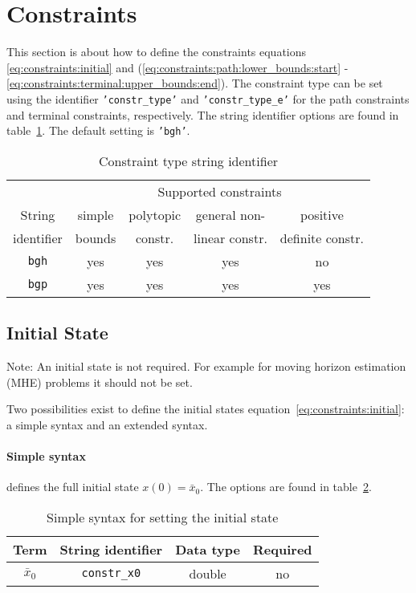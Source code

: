 \documentclass[english]{article}
\newcommand{\code}[1]{\texttt{#1}}
\newcommand{\str}[1]{\texttt{'#1'}}
\newcommand{\optional}{no}
\begin{document}
\section{Constraints}\label{sec:constraints}
%
This section is about how to define the constraints equations \eqref{eq:constraints:initial} and (\ref{eq:constraints:path:lower_bounds:start} - \ref{eq:constraints:terminal:upper_bounds:end}). The constraint type can be set using the identifier \str{constr\_type} and \str{constr\_type\_e} for the path constraints and terminal constraints, respectively. The string identifier options are found in table~\ref{tab:constr_type}. The default setting is \str{bgh}.
\begin{table}[h!]
\centering
\caption{Constraint type string identifier}\label{tab:constr_type}
%
\begin{tabular}{ccccc}
    \toprule
    & \multicolumn{4}{c}{Supported constraints} \\ \cmidrule{2-5}
    String     & simple & polytopic & general non-   & positive \\
    identifier & bounds & constr.   & linear constr. & definite constr.\\ \midrule
    \code{bgh} & yes & yes & yes & no \\
    \code{bgp} & yes & yes & yes & yes \\
    \bottomrule
\end{tabular}
\end{table}
%
\subsection{Initial State}\label{sec:constraints:initial}
%
Note: An initial state is not required.
For example for moving horizon estimation (MHE) problems it should not be set.

Two possibilities exist to define the initial states equation~\eqref{eq:constraints:initial}: a simple syntax and an extended syntax.

\paragraph{Simple syntax}
defines the full initial state $x(0)=\bar{x}_0$. The options are found in table~\ref{tab:constraints:simplesyntax}.
\begin{table}[h!]
    \centering
    \caption{Simple syntax for setting the initial state} \label{tab:constraints:simplesyntax}
    \begin{tabular}{cccc}
        \toprule
        Term & String identifier & Data type & Required \\ \midrule
        $ \bar{x}_0 $ & \code{constr\_x0} & double & \optional \\
        \bottomrule
    \end{tabular}
\end{table}
%
\end{document}
